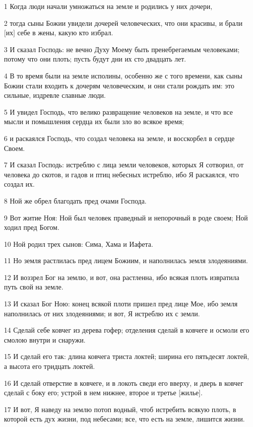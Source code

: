 \par 1 Когда люди начали умножаться на земле и родились у них дочери,
\par 2 тогда сыны Божии увидели дочерей человеческих, что они красивы, и брали [их] себе в жены, какую кто избрал.
\par 3 И сказал Господь: не вечно Духу Моему быть пренебрегаемым человеками; потому что они плоть; пусть будут дни их сто двадцать лет.
\par 4 В то время были на земле исполины, особенно же с того времени, как сыны Божии стали входить к дочерям человеческим, и они стали рождать им: это сильные, издревле славные люди.
\par 5 И увидел Господь, что велико развращение человеков на земле, и что все мысли и помышления сердца их были зло во всякое время;
\par 6 и раскаялся Господь, что создал человека на земле, и восскорбел в сердце Своем.
\par 7 И сказал Господь: истреблю с лица земли человеков, которых Я сотворил, от человека до скотов, и гадов и птиц небесных истреблю, ибо Я раскаялся, что создал их.
\par 8 Ной же обрел благодать пред очами Господа.
\par 9 Вот житие Ноя: Ной был человек праведный и непорочный в роде своем; Ной ходил пред Богом.
\par 10 Ной родил трех сынов: Сима, Хама и Иафета.
\par 11 Но земля растлилась пред лицем Божиим, и наполнилась земля злодеяниями.
\par 12 И воззрел Бог на землю, и вот, она растленна, ибо всякая плоть извратила путь свой на земле.
\par 13 И сказал Бог Ною: конец всякой плоти пришел пред лице Мое, ибо земля наполнилась от них злодеяниями; и вот, Я истреблю их с земли.
\par 14 Сделай себе ковчег из дерева гофер; отделения сделай в ковчеге и осмоли его смолою внутри и снаружи.
\par 15 И сделай его так: длина ковчега триста локтей; ширина его пятьдесят локтей, а высота его тридцать локтей.
\par 16 И сделай отверстие в ковчеге, и в локоть сведи его вверху, и дверь в ковчег сделай с боку его; устрой в нем нижнее, второе и третье [жилье].
\par 17 И вот, Я наведу на землю потоп водный, чтоб истребить всякую плоть, в которой есть дух жизни, под небесами; все, что есть на земле, лишится жизни.
